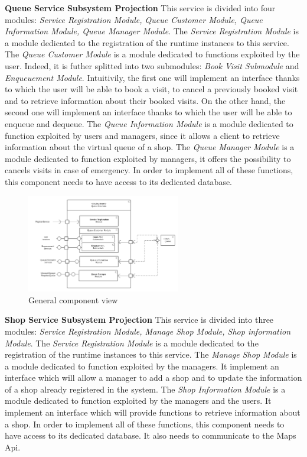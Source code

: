 \textbf{Queue Service Subsystem Projection}
This service is divided into four modules: \textit{Service Registration Module, Queue Customer Module, Queue Information Module, Queue Manager Module}. 
The \textit{Service Registration Module} is a module dedicated to the registration of the runtime instances to this service.
The \textit{Queue Customer Module} is a module dedicated to functions exploited by the user. Indeed, it is futher splitted into two submodules: \textit{Book Visit Submodule} and \textit{Enqueuement Module}. 
Intuitivily, the first one will implement an interface thanks to which the user will be able to book a visit, to cancel a previously booked visit and to retrieve information about their booked visits.
On the other hand, the second one will implement an interface thanks to which the user will be able to enqueue and dequeue.
The \textit{Queue Information Module} is a module dedicated to function exploited by users and managers, since it allows a client to retrieve information about the virtual queue of a shop.
The \textit{Queue Manager Module} is a module dedicated to function exploited by managers, it offers the possibility to cancels visits in case of emergency.
In order to implement all of these functions, this component needs to have access to its dedicated database.

\begin{figure}[h!]
    \centering
    \includegraphics[width=0.6\textwidth]{Images/ComponentViewQueueService.png}
    \caption{\label{fig:ComponentViewQueueServices}{General component view}}
\end{figure}


\textbf{Shop Service Subsystem Projection}
This service is divided into three modules: \textit{Service Registration Module, Manage Shop Module, Shop information Module}. 
The \textit{Service Registration Module} is a module dedicated to the registration of the runtime instances to this service.
The \textit{Manage Shop Module} is a module dedicated to function exploited by the managers. It implement an interface which will allow a manager to add a shop and to update the information of a shop already registered in the system.
The \textit{Shop Information Module} is a module dedicated to function exploited by the managers and the users. It implement an interface which will provide functions to retrieve information about a shop.
In order to implement all of these functions, this component needs to have access to its dedicated database. It also needs to communicate to the Maps Api.

